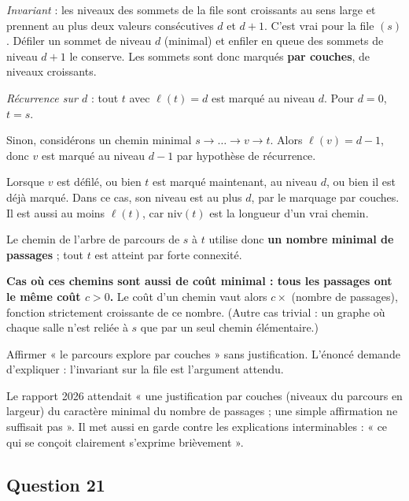 \documentclass[11pt,a4paper]{article}
\begin{document}
\emph{Invariant} : les niveaux des sommets de la file sont croissants au sens large et prennent au plus deux valeurs consécutives \(d\) et \(d+1\). C'est vrai pour la file \((s)\). Défiler un sommet de niveau \(d\) (minimal) et enfiler en queue des sommets de niveau \(d+1\) le conserve. Les sommets sont donc marqués \textbf{par couches}, de niveaux croissants.

\emph{Récurrence sur \(d\)} : tout \(t\) avec \(\ell(t) = d\) est marqué au niveau \(d\). Pour \(d = 0\), \(t = s\).

Sinon, considérons un chemin minimal \(s \to \dots \to v \to t\). Alors \(\ell(v) = d - 1\), donc \(v\) est marqué au niveau \(d - 1\) par hypothèse de récurrence.

Lorsque \(v\) est défilé, ou bien \(t\) est marqué maintenant, au niveau \(d\), ou bien il est déjà marqué. Dans ce cas, son niveau est au plus \(d\), par le marquage par couches. Il est aussi au moins \(\ell(t)\), car \(\mathrm{niv}(t)\) est la longueur d'un vrai chemin.

Le chemin de l'arbre de parcours de \(s\) à \(t\) utilise donc \textbf{un nombre minimal de passages} ; tout \(t\) est atteint par forte connexité.

\textbf{Cas où ces chemins sont aussi de coût minimal : tous les passages ont le même coût \(c > 0\).} Le coût d'un chemin vaut alors \(c \times\) (nombre de passages), fonction strictement croissante de ce nombre. (Autre cas trivial : un graphe où chaque salle n'est reliée à \(s\) que par un seul chemin élémentaire.)

\begin{piege}

Affirmer « le parcours explore par couches » sans justification. L'énoncé demande d'expliquer : l'invariant sur la file est l'argument attendu.

\end{piege}

\begin{jury}

Le rapport 2026 attendait « une justification par couches (niveaux du parcours en largeur) du caractère minimal du nombre de passages ; une simple affirmation ne suffisait pas ». Il met aussi en garde contre les explications interminables : « ce qui se conçoit clairement s'exprime brièvement ».

\end{jury}

\hypertarget{question-21}{%
\subsection{Question 21}\label{question-21}}
\end{document}
